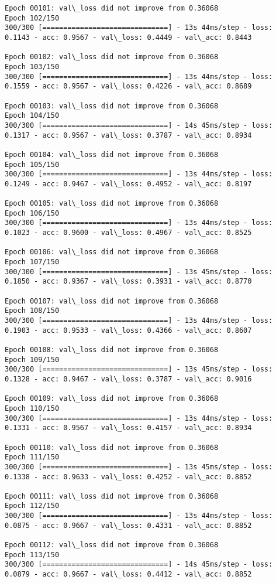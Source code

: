 \documentclass[11pt]{article}
\begin{document}
\begin{Verbatim}[commandchars=\\\{\}]
Epoch 00101: val\_loss did not improve from 0.36068
Epoch 102/150
300/300 [==============================] - 13s 44ms/step - loss: 0.1143 - acc: 0.9567 - val\_loss: 0.4449 - val\_acc: 0.8443

Epoch 00102: val\_loss did not improve from 0.36068
Epoch 103/150
300/300 [==============================] - 13s 44ms/step - loss: 0.1559 - acc: 0.9567 - val\_loss: 0.4226 - val\_acc: 0.8689

Epoch 00103: val\_loss did not improve from 0.36068
Epoch 104/150
300/300 [==============================] - 14s 45ms/step - loss: 0.1317 - acc: 0.9567 - val\_loss: 0.3787 - val\_acc: 0.8934

Epoch 00104: val\_loss did not improve from 0.36068
Epoch 105/150
300/300 [==============================] - 13s 44ms/step - loss: 0.1249 - acc: 0.9467 - val\_loss: 0.4952 - val\_acc: 0.8197

Epoch 00105: val\_loss did not improve from 0.36068
Epoch 106/150
300/300 [==============================] - 13s 44ms/step - loss: 0.1023 - acc: 0.9600 - val\_loss: 0.4967 - val\_acc: 0.8525

Epoch 00106: val\_loss did not improve from 0.36068
Epoch 107/150
300/300 [==============================] - 13s 45ms/step - loss: 0.1850 - acc: 0.9367 - val\_loss: 0.3931 - val\_acc: 0.8770

Epoch 00107: val\_loss did not improve from 0.36068
Epoch 108/150
300/300 [==============================] - 13s 44ms/step - loss: 0.1903 - acc: 0.9533 - val\_loss: 0.4366 - val\_acc: 0.8607

Epoch 00108: val\_loss did not improve from 0.36068
Epoch 109/150
300/300 [==============================] - 13s 45ms/step - loss: 0.1328 - acc: 0.9467 - val\_loss: 0.3787 - val\_acc: 0.9016

Epoch 00109: val\_loss did not improve from 0.36068
Epoch 110/150
300/300 [==============================] - 13s 44ms/step - loss: 0.1331 - acc: 0.9567 - val\_loss: 0.4157 - val\_acc: 0.8934

Epoch 00110: val\_loss did not improve from 0.36068
Epoch 111/150
300/300 [==============================] - 13s 45ms/step - loss: 0.1338 - acc: 0.9633 - val\_loss: 0.4252 - val\_acc: 0.8852

Epoch 00111: val\_loss did not improve from 0.36068
Epoch 112/150
300/300 [==============================] - 13s 44ms/step - loss: 0.0875 - acc: 0.9667 - val\_loss: 0.4331 - val\_acc: 0.8852

Epoch 00112: val\_loss did not improve from 0.36068
Epoch 113/150
300/300 [==============================] - 14s 45ms/step - loss: 0.0879 - acc: 0.9667 - val\_loss: 0.4412 - val\_acc: 0.8852


\end{Verbatim}
\end{document}
